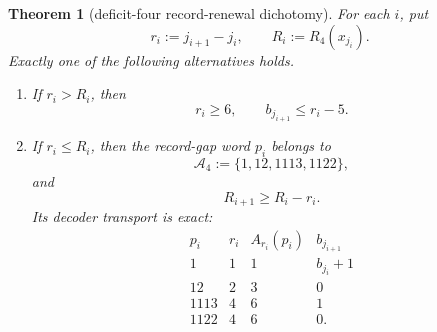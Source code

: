 \documentclass[11pt]{article}
\newtheorem{theorem}{Theorem}
\begin{document}
\begin{theorem}[deficit-four record-renewal dichotomy]
For each $i$, put
\[
  r_i:=j_{i+1}-j_i,
  \qquad
  R_i:=R_4(x_{j_i}).
  \tag{17}
\]
Exactly one of the following alternatives holds.

\begin{enumerate}
  \item If $r_i>R_i$, then
  \[
    r_i\geq6,
    \qquad
    b_{j_{i+1}}\leq r_i-5.
    \tag{18}
  \]

  \item If $r_i\leq R_i$, then the record-gap word $p_i$ belongs to
  \[
    \mathcal A_4:=\{1,12,1113,1122\},
    \tag{19}
  \]
  and
  \[
    R_{i+1}\geq R_i-r_i.
    \tag{20}
  \]
  Its decoder transport is exact:
  \[
    \begin{array}{c|c|c|c}
      p_i&r_i&A_{r_i}(p_i)&b_{j_{i+1}}\\ \hline
      1&1&1&b_{j_i}+1\\
      12&2&3&0\\
      1113&4&6&1\\
      1122&4&6&0.
    \end{array}
    \tag{21}
  \]
\end{enumerate}
\end{theorem}
\end{document}
